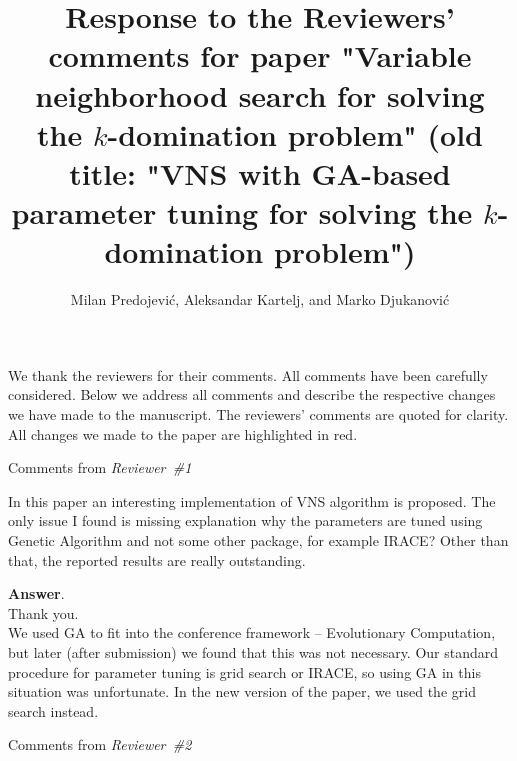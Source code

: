 \documentclass [11pt]{scrartcl}
\title{\Large{Response to the Reviewers' comments for paper "Variable neighborhood search for solving the $k$-domination problem" (old title: "VNS with GA-based parameter tuning for solving the $k$-domination problem")} }
\author{{Milan Predojević}, {Aleksandar Kartelj}, and {Marko Djukanović} }
\begin{document}
\maketitle 

We thank the reviewers for their   comments. All comments have been carefully considered. Below we address all comments and describe the respective changes we have made to the manuscript. The reviewers' comments are quoted for clarity. All changes we made to the paper are highlighted in red.
  
\begin{center} 
Comments from \textit{Reviewer\ \#1}
\end{center}

\begin{leftbar}

In this paper an interesting implementation of VNS algorithm is proposed. The only issue I found is missing explanation why the parameters are tuned using Genetic Algorithm and not some other package, for example IRACE? Other than that, the reported results are really outstanding.

\end{leftbar}
\textbf{Answer}. \\
 Thank you. \\
We used GA to fit into the conference framework -- Evolutionary Computation, but later (after submission) we found that this was not necessary.
Our standard procedure for parameter tuning is grid search or IRACE, so using GA in this situation was unfortunate. In the new version of the paper, we used the grid search instead.
 
\begin{center} 
	Comments from \textit{Reviewer\ \#2}
\end{center}
\end{document}
